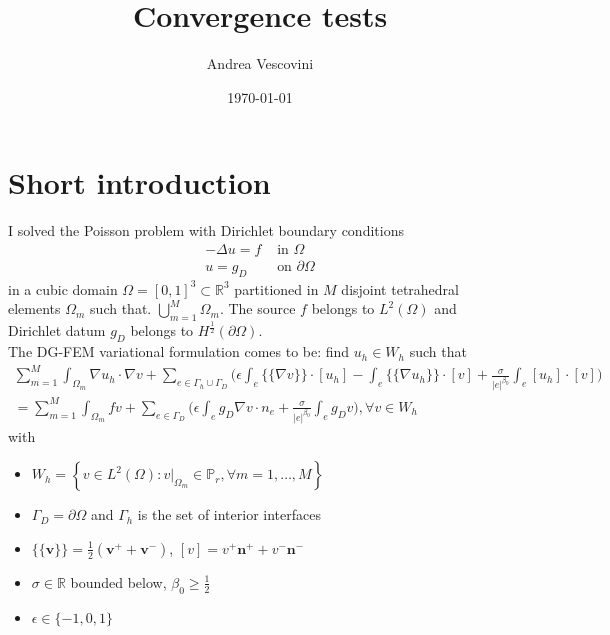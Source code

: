 \documentclass[12pt, a4paper]{article}
\title{\textbf{Convergence tests}}
\author{Andrea Vescovini}
\date{\today}
\begin{document}
	\maketitle

\section{Short introduction}
I solved the Poisson problem with Dirichlet boundary conditions
\begin{align}
	-\Delta u = f &\mbox{ in } \Omega\\
	u = g_{D} & \mbox{ on } \partial\Omega
\end{align}
in a cubic domain $\Omega = [0,1]^{3} \subset \mathbb{R}^{3} $ partitioned in $M$ disjoint tetrahedral elements $\Omega_{m}$ such that. $\bigcup\limits_{m=1}^{M} \Omega_{m} $.
The source $f$ belongs to $L^2(\Omega)$ and Dirichlet datum $ g_{D}$ belongs to $H^{\frac{1}{2}}(\partial \Omega) $.\\
The DG-FEM variational formulation comes to be: find $u_{h} \in W_{h}$ such that
\begin{multline}
	\sum_{m = 1}^{M} \int_{\Omega_{m}} \nabla u_{h} \cdot \nabla v
	+ \sum_{e\in \Gamma_{h} \cup \Gamma_{D}} \bigg( \epsilon \int_{e} \{\!\!\{ \nabla v \}\!\!\} \cdot [ u_{h} ]
	- \int_{e} \{\!\!\{ \nabla u_{h} \}\!\!\} \cdot [v]
	+ \frac{\sigma}{|e|^{\beta_{0}}} \int_{e} [u_h] \cdot [v] \bigg)\\
	= \sum_{m=1}^{M} \int_{\Omega_{m}} fv
	+ \sum_{e \in \Gamma_{D}} \bigg( \epsilon \int_{e} g_{D} \nabla v \cdot n_{e} + \frac{\sigma}{|e|^{\beta_{0}}} \int_{e} g_{D} v  \bigg),
	\forall v \in W_{h}
\end{multline}
with
\begin{itemize}
\item $ W_{h} = \left\{ v \in L^{2}(\Omega) : v|_{\Omega_{m}} \in \mathbb{P}_{r},  \forall m = 1,\dots, M \right\} $
\item $ \Gamma_{D} = \partial \Omega $ and $ \Gamma_{h} $ is the set of interior interfaces
\item $ \{\!\!\{ \mathbf{v} \}\!\!\} = \frac{1}{2} (\mathbf{v}^{+}+\mathbf{v}^{-}) $, $ [v] = v^{+} \mathbf{n}^{+} + v^{-} \mathbf{n}^{-} $
\item $ \sigma \in \mathbb{R} $ bounded below, $ \beta_{0} \geq \frac{1}{2} $
\item $ \epsilon \in \{-1, 0, 1\} $
\end{itemize}
\end{document}
